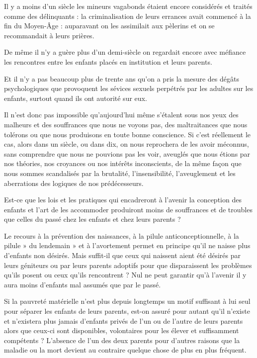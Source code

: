  Il y a moins d'un siècle les mineurs vagabonds étaient encore considérés et traités comme des délinquants : la criminalisation de leurs errances avait commencé à la fin du Moyen-Âge : auparavant on les assimilait aux pèlerins et on se recommandait à leurs prières. 

 De même il n'y a guère plus d'un demi-siècle on regardait encore avec méfiance les rencontres entre les enfants placés en institution et leurs parents. 

 Et il n'y a pas beaucoup plus de trente ans qu'on a pris la mesure des dégâts psychologiques que provoquent les sévices sexuels perpétrés par les adultes sur les enfants, surtout quand ils ont autorité sur eux. 

 Il n'est donc pas impossible qu'aujourd'hui même s'étalent sous nos yeux des malheurs et des souffrances que nous ne voyons pas, des maltraitances que nous tolérons ou que nous produisons en toute bonne conscience. Si c'est réellement le cas, alors dans un siècle, ou dans dix, on nous reprochera de les avoir méconnus, sans comprendre que nous ne pouvions pas les voir, aveuglés que nous étions par nos théories, nos croyances ou nos intérêts inconscients, de la même façon que nous sommes scandalisés par la brutalité, l'insensibilité, l'aveuglement et les aberrations des logiques de nos prédécesseurs. 

 Est-ce que les lois et les pratiques qui encadreront à l'avenir la conception des enfants et l'art de les accommoder produiront moins de souffrances et de troubles que celles du passé chez les enfants et chez leurs parents ?
 

 Le recours à la prévention des naissances, à la pilule anticonceptionnelle, à la pilule » du lendemain » et à l'avortement permet en principe qu'il ne naisse plus d'enfants non désirés. Mais suffit-il que ceux qui naissent aient été désirés par leurs géniteurs ou par leurs parents adoptifs pour que disparaissent les problèmes qu'ils posent ou ceux qu'ils rencontrent ? Nul ne peut garantir qu'à l'avenir il y aura moins d'enfants mal assumés que par le passé. 

 Si la pauvreté matérielle n'est plus depuis longtemps un motif suffisant à lui seul pour séparer les enfants de leurs parents, est-on assuré pour autant qu'il n'existe et n'existera plus jamais d'enfants privés de l'un ou de l'autre de leurs parents alors que ceux-ci sont disponibles, volontaires pour les élever et suffisamment compétents ? L'absence de l'un des deux parents pour d'autres raisons que la maladie ou la mort devient au contraire quelque chose de plus en plus fréquent. 

